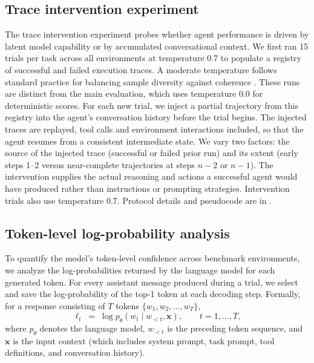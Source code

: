 \subsection{Trace intervention experiment} \label{sec:method_intervention}
The trace intervention experiment probes whether agent performance is driven by latent model capability or by accumulated conversational context. We first ran 15 trials per task across all environments at temperature 0.7 to populate a registry of successful and failed execution traces. A moderate temperature follows standard practice for balancing sample diversity against coherence \autocite{chen2021evaluating}. These runs are distinct from the main evaluation, which uses temperature 0.0 for deterministic scores. For each new trial, we inject a partial trajectory from this registry into the agent's conversation history before the trial begins. The injected traces are replayed, tool calls and environment interactions included, so that the agent resumes from a consistent intermediate state. We vary two factors: the source of the injected trace (successful or failed prior run) and its extent (early steps 1--2 versus near-complete trajectories at steps $n{-}2$ or $n{-}1$). The intervention supplies the actual reasoning and actions a successful agent would have produced rather than instructions or prompting strategies. Intervention trials also use temperature 0.7. Protocol details and pseudocode are in .



\subsection{Token-level log-probability analysis}
  \label{sec:logprob-analysis}

  To quantify the model's token-level confidence across benchmark environments, we analyze the log-probabilities returned by the language model for each
  generated token. For every assistant message produced during a trial, we select and save the log-probability of the top-1 token at each
  decoding step. Formally, for a response consisting of $T$ tokens
  $\{w_1, w_2, \ldots, w_T\}$,
  \begin{equation}
    \ell_t \;=\; \log p_\theta(w_t \mid w_{<t}, \mathbf{x}),
    \qquad t = 1, \ldots, T,
    \label{eq:token-logprob}
  \end{equation}
  where $p_\theta$ denotes the language model, $w_{<t}$ is the preceding token
  sequence, and $\mathbf{x}$ is the input context (which includes system prompt, task prompt, tool
  definitions, and conversation history).

